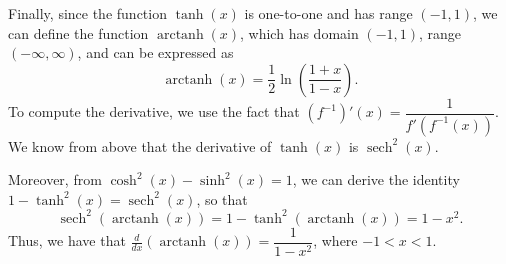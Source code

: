 \documentclass[12pt,letterpaper]{article}
\DeclareMathOperator{\arctanh}{arctanh}
\begin{document}
Finally, since the function $\tanh(x)$ is one-to-one and has range $(-1,1)$, we can define the function $\arctanh(x)$, which has domain $(-1,1)$, range $(-\infty,\infty)$, and can be expressed as
\[
\arctanh(x) = \frac{1}{2}\ln\left(\frac{1+x}{1-x}\right).
\]
To compute the derivative, we use the fact that $(f^{-1})'(x) = \dfrac{1}{f'(f^{-1}(x))}$. We know from above that the derivative of $\tanh(x)$ is $\operatorname{sech}^2(x)$.

Moreover, from $\cosh^2(x)-\sinh^2(x)=1$, we can derive the identity $1-\tanh^2(x) = \operatorname{sech}^2(x)$, so that
\[
\operatorname{sech}^2(\arctanh(x)) = 1-\tanh^2(\arctanh(x))=1-x^2.
\]
Thus, we have that $\frac{d}{dx}(\arctanh(x)) = \dfrac{1}{1-x^2}$, where $-1<x<1$.
\end{document}

